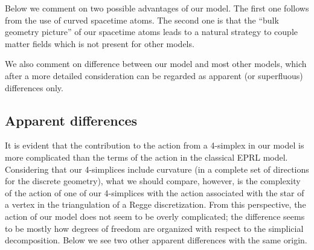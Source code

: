 \documentclass{article}
\begin{document}
Below we comment on two possible advantages of our model. The first one follows from the use of curved spacetime atoms. The second one is that the ``bulk geometry picture'' of our spacetime atoms leads to a natural strategy to couple matter fields which is not present for other models. 

We also comment on difference between our model and most other models, which after a more detailed consideration can be regarded as apparent (or superfluous) differences only. 

\subsection{Apparent differences}



It is evident that the contribution to the action from a 4-simplex in our model is more complicated than the terms of the action in the classical EPRL model. Considering that our 4-simplices include curvature (in a complete set of directions for the discrete geometry), what we should compare, however, is the complexity of the action of one of our 4-simplices with the action associated with the star of a vertex in the triangulation of a Regge discretization. From this perspective, the action of our model does not seem to be overly complicated; the difference seems to be mostly how degrees of freedom are organized with respect to the simplicial decomposition. Below we see two other apparent differences with the same origin. 
\end{document}
